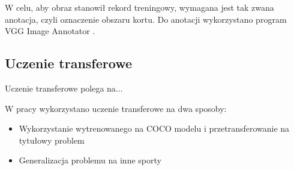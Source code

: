 W celu, aby obraz stanowił rekord treningowy, wymagana jest tak zwana anotacja, czyli oznaczenie obszaru kortu. Do anotacji wykorzystano program VGG Image Annotator \cite{vgg-via}.
\\


\subsection{Uczenie transferowe}
\label{sec:uczenie-transferowe}

Uczenie transferowe polega na...

W pracy wykorzystano uczenie transferowe na dwa sposoby:

\begin{itemize}
	\item Wykorzystanie wytrenowanego na COCO modelu i przetransferowanie na tytułowy problem
	\item Generalizacja problemu na inne sporty
\end{itemize}
